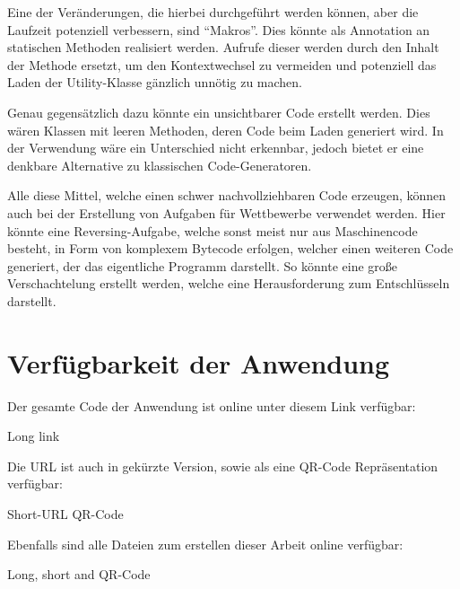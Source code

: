Eine der Veränderungen, die hierbei durchgeführt werden können, aber die Laufzeit potenziell verbessern, sind "`Makros"'. Dies könnte als Annotation an statischen Methoden realisiert werden. Aufrufe dieser werden durch den Inhalt der Methode ersetzt, um den Kontextwechsel zu vermeiden und potenziell das Laden der Utility-Klasse gänzlich unnötig zu machen.

Genau gegensätzlich dazu könnte ein unsichtbarer Code erstellt werden. Dies wären Klassen mit leeren Methoden, deren Code beim Laden generiert wird. In der Verwendung wäre ein Unterschied nicht erkennbar, jedoch bietet er eine denkbare Alternative zu klassischen Code-Generatoren.

Alle diese Mittel, welche einen schwer nachvollziehbaren Code erzeugen, können auch bei der Erstellung von Aufgaben für Wettbewerbe verwendet werden. Hier könnte eine Reversing-Aufgabe, welche sonst meist nur aus Maschinencode besteht, in Form von komplexem Bytecode erfolgen, welcher einen weiteren Code generiert, der das eigentliche Programm darstellt. So könnte eine große Verschachtelung erstellt werden, welche eine Herausforderung zum Entschlüsseln darstellt.

\chapter{Verfügbarkeit der Anwendung}

Der gesamte Code der Anwendung ist online unter diesem Link verfügbar:

Long link

Die URL ist auch in gekürzte Version, sowie als eine QR-Code Repräsentation verfügbar:

Short-URL QR-Code

Ebenfalls sind alle Dateien zum erstellen dieser Arbeit online verfügbar:

Long, short and QR-Code